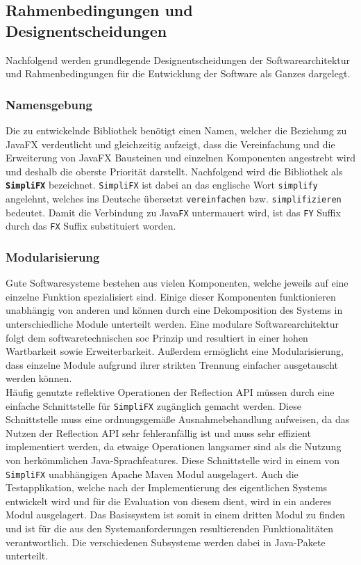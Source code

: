 \subsection{Rahmenbedingungen und Designentscheidungen}
\label{konzept_und_modellierung_designentscheidungen}
Nachfolgend werden grundlegende Designentscheidungen der Softwarearchitektur und Rahmenbedingungen für die Entwicklung der Software als Ganzes dargelegt.
\subsubsection{Namensgebung}
Die zu entwickelnde Bibliothek benötigt einen Namen, welcher die Beziehung zu JavaFX verdeutlicht und gleichzeitig aufzeigt, dass die Vereinfachung und die Erweiterung von JavaFX Bausteinen und einzelnen Komponenten angestrebt wird und deshalb die oberste Priorität darstellt. Nachfolgend wird die Bibliothek als \textbf{\texttt{SimpliFX}} bezeichnet. \texttt{SimpliFX} ist dabei an das englische Wort \texttt{simplify} angelehnt, welches ins Deutsche übersetzt \texttt{vereinfachen} bzw. \texttt{simplifizieren} bedeutet. Damit die Verbindung zu Java\texttt{FX} untermauert wird, ist das \texttt{FY} Suffix durch das \texttt{FX} Suffix substituiert worden.
\subsubsection{Modularisierung}
Gute Softwaresysteme bestehen aus vielen Komponenten, welche jeweils auf eine einzelne Funktion spezialisiert sind. Einige dieser Komponenten funktionieren unabhängig von anderen und können durch eine Dekomposition des Systems in unterschiedliche Module unterteilt werden. Eine modulare Softwarearchitektur folgt dem softwaretechnischen \ac{soc} Prinzip und resultiert in einer hohen Wartbarkeit sowie Erweiterbarkeit. Außerdem ermöglicht eine Modularisierung, dass einzelne Module aufgrund ihrer strikten Trennung einfacher ausgetauscht werden können.\\
Häufig genutzte reflektive Operationen der Reflection API müssen durch eine einfache Schnittstelle für \texttt{SimpliFX} zugänglich gemacht werden. Diese Schnittstelle muss eine ordnungsgemäße Ausnahmebehandlung aufweisen, da das Nutzen der Reflection API sehr fehleranfällig ist und muss sehr effizient implementiert werden, da etwaige Operationen langsamer sind als die Nutzung von herkömmlichen Java-Sprachfeatures. Diese Schnittstelle wird in einem von \texttt{SimpliFX} unabhängigen Apache Maven Modul ausgelagert. Auch die Testapplikation, welche nach der Implementierung des eigentlichen Systems entwickelt wird und für die Evaluation von diesem dient, wird in ein anderes Modul ausgelagert. Das Basissystem ist somit in einem dritten Modul zu finden und ist für die aus den Systemanforderungen resultierenden Funktionalitäten verantwortlich. Die verschiedenen Subsysteme werden dabei in Java-Pakete unterteilt.

